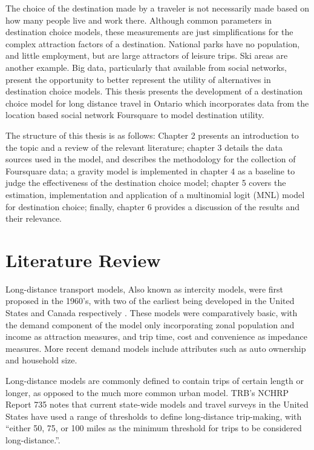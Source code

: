The choice of the destination made by a traveler is not necessarily made based on how many people live and work there. Although common parameters in destination choice models, these measurements are just simplifications for the complex attraction factors of a destination. National parks have no population, and little employment, but are large attractors of leisure trips. Ski areas are another example. Big data, particularly that available from social networks, present the opportunity to better represent the utility of alternatives in destination choice models. This thesis presents the development of a destination choice model for long distance travel in Ontario which incorporates  data from the location based social network Foursquare to model destination utility.

The structure of this thesis is as follows: Chapter 2 presents an introduction to the topic and a review of the relevant literature; chapter 3 details the data sources used in the model, and describes the methodology for the collection of Foursquare data; a gravity model is implemented in chapter 4 as a baseline to judge the effectiveness of  the destination choice model; chapter 5 covers the estimation, implementation and application of a multinomial logit (MNL) model for destination choice; finally, chapter 6 provides a discussion of the results and their relevance.


\chapter{Literature Review}
\label{section:lit-review}

Long-distance transport models, Also known as intercity models, were first proposed in the 1960’s, with two of the earliest being developed in the United States and Canada respectively \parencite{CTC71}. These models were comparatively basic, with the demand component of the model only incorporating zonal population and income as attraction measures, and trip time, cost and convenience as impedance measures. More recent demand models include attributes such as auto ownership and household size. 

Long-distance models are commonly defined to contain trips of certain length or longer, as opposed to the much more common urban model. TRB's NCHRP Report 735 notes that current state-wide models and travel surveys in the United States have used a range of thresholds to define long-distance trip-making, with \enquote{either 50, 75, or 100 miles as the minimum threshold for trips to be considered long-distance.}\autocite{schif12}.

